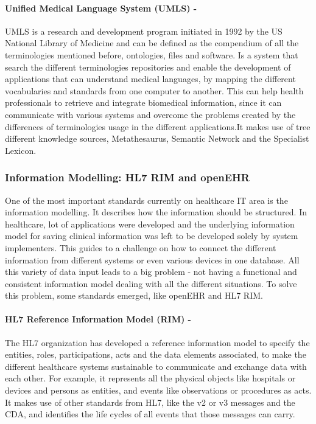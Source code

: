 \documentclass[mim_thesis.tex]{subfiles}
\begin{document}
\paragraph{\textbf{Unified Medical Language System (UMLS) -}}
UMLS is a research and development program initiated in 1992 by the US National Library of Medicine and can be defined as the compendium of all the terminologies mentioned before, ontologies, files and software. Is a system that search the different terminologies repositories and enable the development of applications that can understand medical languages, by mapping the different vocabularies and standards from one computer to another. This can help health professionals to retrieve and integrate biomedical information, since it can communicate with various systems and overcome the problems created by the differences of terminologies usage in the different applications.It makes use of tree different knowledge sources, Metathesaurus, Semantic Network and the Specialist Lexicon.


\subsubsection{Information Modelling: HL7 RIM and openEHR }
One of the most important standards currently on healthcare IT area is the information modelling. It describes how the information should be structured. In healthcare, lot of applications were developed and the underlying information model for saving clinical information was left to be developed solely by system implementers. This guides to a challenge on how to connect the different information from different systems or even various devices in one database. \citep{huff1995event} All this variety of data input leads to a big problem - not having a functional and consistent information model dealing with all the different situations. To solve this problem, some standards emerged, like openEHR and HL7 RIM. \citep{piho2015business}

\paragraph{\textbf{HL7 Reference Information Model (RIM) -}}
The HL7 organization has developed a reference information model to specify the entities, roles, participations, acts and the data elements associated, to make the different healthcare systems sustainable to communicate and exchange data with each other. For example, it represents all the physical objects like hospitals or devices and persons as entities, and events like observations or procedures as acts. It makes use of other standards from HL7, like the v2 or v3 messages and the CDA, and identifies the life cycles of all events that those messages can carry.
\end{document}

